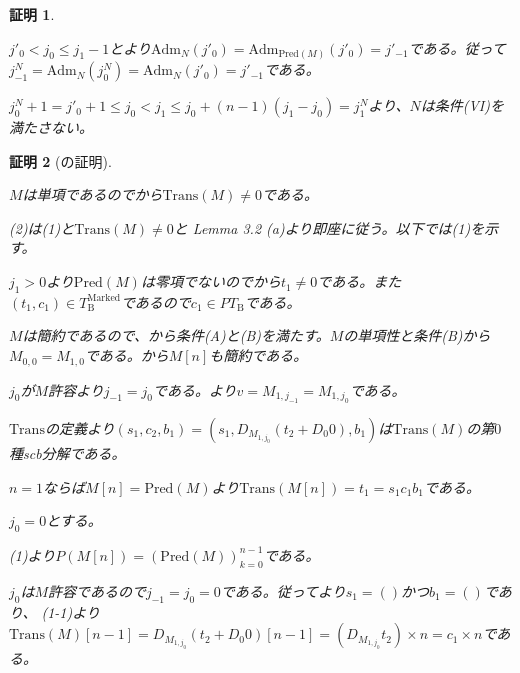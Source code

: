 \documentclass[dvipdfmx,uplatex]{jsarticle}
\newif\iffull
\theoremstyle{customnonumberbreakfortheorem}
\theoremstyle{customnonumberbreakforproof}
\newtheorem{hideableproof}{証明}
\begin{document}
\begin{hideableproof}
\begin{indented}
		\item \(j'_0 < j_0 \leq j_1-1\)とより\(\textrm{Adm}_N(j'_0) = \textrm{Adm}_{\textrm{Pred}(M)}(j'_0) = j'_{-1}\)である。従って\(j_{-1}^N = \textrm{Adm}_N(j_0^N) = \textrm{Adm}_N(j'_0) = j'_{-1}\)である。
		\item \(j_0^N+1 = j'_0+1 \leq j_0 < j_1 \leq j_0+(n-1)(j_1-j_0) = j_1^N\)より、\(N\)は条件(VI)を満たさない。
	\end{indented}
\end{hideableproof}

\iffull{それでは本題に戻る。}\fi

\begin{hideableproof}[の証明]
	\begin{indented}
		\item \(M\)は単項であるのでから\(\textrm{Trans}(M) \neq 0\)である。
		\item (2)は(1)と\(\textrm{Trans}(M) \neq 0\)と\cite{buc1} Lemma 3.2 (a)より即座に従う。以下では(1)を示す。
		\item \(j_1 > 0\)より\(\textrm{Pred}(M)\)は零項でないのでから\(t_1 \neq 0\)である。また\((t_1,c_1) \in T_{\textrm{B}}^{\textrm{Marked}}\)であるので\(c_1 \in PT_{\textrm{B}}\)である。
		\item \(M\)は簡約であるので、から条件(A)と(B)を満たす。\(M\)の単項性と条件(B)から\(M_{0,0} = M_{1,0}\)である。から\(M[n]\)も簡約である。
		\item \(j_0\)が\(M\)許容より\(j_{-1} = j_0\)である。より\(v = M_{1,j_{-1}} = M_{1,j_0}\)である。
		\item \(\textrm{Trans}\)の定義より\((s_1,c_2,b_1) = (s_1,D_{M_{1,j_0}}(t_2 + D_0 0), b_1)\)は\(\textrm{Trans}(M)\)の第\(0\)種scb分解である。
		\item \(n = 1\)ならば\(M[n] = \textrm{Pred}(M)\)より\(\textrm{Trans}(M[n]) = t_1 = s_1 c_1 b_1\)である。
		\item
		\item \(j_0 = 0\)とする。
		\begin{indented}
			\item {} (1)より\(P(M[n]) = (\textrm{Pred}(M))_{k=0}^{n-1}\)である。
			\item \(j_0\)は\(M\)許容であるので\(j_{-1} = j_0 = 0\)である。従ってより\(s_1 = ()\)かつ\(b_1 = ()\)であり、 (1-1)より\(\textrm{Trans}(M)[n-1] = D_{M_{1,j_0}}(t_2 + D_0 0)[n-1] = (D_{M_{1,j_0}} t_2) \times n  = c_1 \times n\)である。

\end{indented}
\end{indented}
\end{hideableproof}
\end{document}
